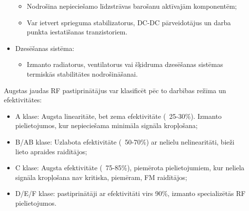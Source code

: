 \begin{itemize}
    \begin{itemize}
        \item Nodrošina nepieciešamo līdzstrāvas barošanu aktīvajām komponentēm;
        \item Var ietvert sprieguma stabilizatorus, DC-DC pārveidotājus un darba punkta iestatīšanas tranzistoriem.
    \end{itemize}
     \item Dzesēšanas sistēma:
     \begin{itemize}
        \item Izmanto radiatorus, ventilatorus vai šķidruma dzesēšanas sistēmas termiskās stabilitātes nodrošināšanai.
    \end{itemize}
\end{itemize}

Augstas jaudas RF pastiprinātājus var klasificēt pēc to darbības režīma un efektivitātes:
\begin{itemize}
    \item A klase: Augsta linearitāte, bet zema efektivitāte (~25-30\%). Izmanto pielietojumos, kur nepieciešama minimāla signāla kropļošana;
    \item B/AB klase: Uzlabota efektivitāte (~50-70\%) ar nelielu nelinearitāti, bieži lieto apraides raidītājos;
    \item C klase: Augsta efektivitāte (~75-85\%), piemērota pielietojumiem, kur neliela signāla kropļošana nav kritiska, piemēram, FM raidītājos;
    \item D/E/F klase: pastiprinātāji ar efektivitāti virs 90\%, izmanto specializētās RF pielietojumos.
\end{itemize}


